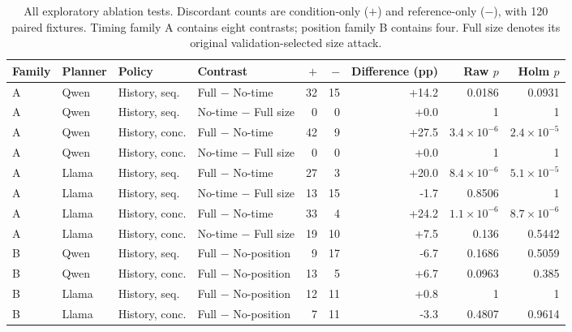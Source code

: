 \begin{table}[t]\centering\footnotesize
\caption{All exploratory ablation tests. Discordant counts are condition-only ($+$) and reference-only ($-$), with 120 paired fixtures. Timing family A contains eight contrasts; position family B contains four. Full size denotes its original validation-selected size attack.}\label{tab:supp-ablation-tests}
\setlength{\tabcolsep}{3pt}
\begin{tabularx}{\textwidth}{@{}lllYrrrrr@{}}\toprule
Family & Planner & Policy & Contrast & $+$ & $-$ & Difference (pp) & Raw $p$ & Holm $p$ \\\midrule
A & Qwen & History, seq. & Full $-$ No-time & 32 & 15 & +14.2 & 0.0186 & 0.0931 \\
A & Qwen & History, seq. & No-time $-$ Full size & 0 & 0 & +0.0 & 1 & 1 \\
A & Qwen & History, conc. & Full $-$ No-time & 42 & 9 & +27.5 & $3.4\!\times\!10^{-6}$ & $2.4\!\times\!10^{-5}$ \\
A & Qwen & History, conc. & No-time $-$ Full size & 0 & 0 & +0.0 & 1 & 1 \\
A & Llama & History, seq. & Full $-$ No-time & 27 & 3 & +20.0 & $8.4\!\times\!10^{-6}$ & $5.1\!\times\!10^{-5}$ \\
A & Llama & History, seq. & No-time $-$ Full size & 13 & 15 & -1.7 & 0.8506 & 1 \\
A & Llama & History, conc. & Full $-$ No-time & 33 & 4 & +24.2 & $1.1\!\times\!10^{-6}$ & $8.7\!\times\!10^{-6}$ \\
A & Llama & History, conc. & No-time $-$ Full size & 19 & 10 & +7.5 & 0.136 & 0.5442 \\
B & Qwen & History, seq. & Full $-$ No-position & 9 & 17 & -6.7 & 0.1686 & 0.5059 \\
B & Qwen & History, conc. & Full $-$ No-position & 13 & 5 & +6.7 & 0.0963 & 0.385 \\
B & Llama & History, seq. & Full $-$ No-position & 12 & 11 & +0.8 & 1 & 1 \\
B & Llama & History, conc. & Full $-$ No-position & 7 & 11 & -3.3 & 0.4807 & 0.9614 \\
\bottomrule\end{tabularx}\end{table}
